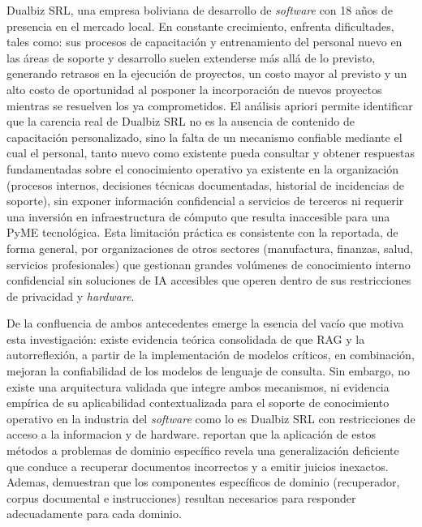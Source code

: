 Dualbiz SRL, una empresa boliviana de desarrollo de \textit{software} con 18 años de presencia en el mercado local. En constante crecimiento, enfrenta dificultades, tales como: sus procesos de capacitación y entrenamiento del personal nuevo en las áreas de soporte y desarrollo suelen extenderse más allá de lo previsto, generando retrasos en la ejecución de proyectos, un costo mayor al previsto y un alto costo de oportunidad al posponer la incorporación de nuevos proyectos mientras se resuelven los ya comprometidos. El análisis apriori permite identificar que la carencia real de Dualbiz SRL no es la ausencia de contenido de capacitación personalizado, sino la falta de un mecanismo confiable mediante el cual el personal, tanto nuevo como existente pueda consultar y obtener respuestas fundamentadas sobre el conocimiento operativo ya existente en la organización (procesos internos, decisiones técnicas documentadas, historial de incidencias de soporte), sin exponer información confidencial a servicios de terceros ni requerir una inversión en infraestructura de cómputo que resulta inaccesible para una PyME tecnológica. Esta limitación práctica es consistente con la reportada, de forma general, por organizaciones de otros sectores (manufactura, finanzas, salud, servicios profesionales) que gestionan grandes volúmenes de conocimiento interno confidencial sin soluciones de IA accesibles que operen dentro de sus restricciones de privacidad y \textit{hardware}.

De la confluencia de ambos antecedentes emerge la esencia del vacío que motiva esta investigación: existe evidencia teórica consolidada de que RAG y la autorreflexión, a partir de la implementación de modelos críticos, en combinación, mejoran la confiabilidad de los modelos de lenguaje de consulta. Sin embargo, no existe una arquitectura validada que integre ambos mecanismos, ni evidencia empírica de su aplicabilidad contextualizada para el soporte de conocimiento operativo en la industria del \textit{software} como lo es Dualbiz SRL con restricciones de acceso a la informacion y de hardware. \textcite{jeong_improving_2024} reportan que la aplicación de estos métodos a problemas de dominio específico revela una generalización deficiente que conduce a recuperar documentos incorrectos y a emitir juicios inexactos. Ademas, demuestran que los componentes específicos de dominio (recuperador, corpus documental e instrucciones) resultan necesarios para responder adecuadamente para cada dominio. 
